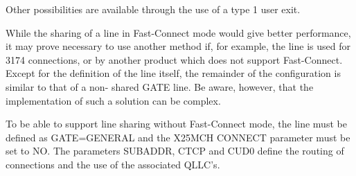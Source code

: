 \documentclass[letterpaper,10pt,english]{sphinxmanual}
\begin{document}
Other possibilities are available through the use of a type 1 user exit.

While the sharing of a line in Fast-Connect mode would give better performance, it may prove necessary to use another method if, for example, the line is used for 3174 connections, or by another product which does not support Fast-Connect. Except for the definition of the line itself, the remainder of the configuration is similar to that of a non- shared GATE line. Be aware, however, that the implementation of such a solution can be complex.

To be able to support line sharing without Fast-Connect mode, the line must be defined as GATE=GENERAL and the X25MCH CONNECT parameter must be set to NO. The parameters SUBADDR, CTCP and CUD0 define the routing of connections and the use of the associated QLLC’s.
\end{document}
